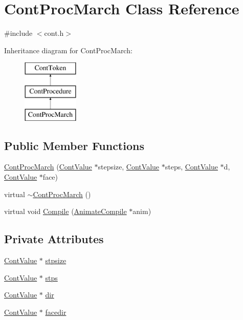 \hypertarget{a00077}{\section{Cont\-Proc\-March Class Reference}
\label{a00077}
}


{\ttfamily \#include $<$cont.\-h$>$}

Inheritance diagram for Cont\-Proc\-March\-:\begin{figure}[H]
\begin{center}
\leavevmode
\includegraphics[height=3.000000cm]{a00077}
\end{center}
\end{figure}
\subsection*{Public Member Functions}
\begin{DoxyCompactItemize}
\item 
\hyperlink{a00077_a759ac42b0956219b07c4ce0afec1595c}{Cont\-Proc\-March} (\hyperlink{a00086}{Cont\-Value} $\ast$stepsize, \hyperlink{a00086}{Cont\-Value} $\ast$steps, \hyperlink{a00086}{Cont\-Value} $\ast$d, \hyperlink{a00086}{Cont\-Value} $\ast$face)
\item 
virtual \hyperlink{a00077_a1612a8773803b35654327e280fe537d0}{$\sim$\-Cont\-Proc\-March} ()
\item 
virtual void \hyperlink{a00077_a98de0ad9854177887775bb191eb16ec4}{Compile} (\hyperlink{a00007}{Animate\-Compile} $\ast$anim)
\end{DoxyCompactItemize}
\subsection*{Private Attributes}
\begin{DoxyCompactItemize}
\item 
\hyperlink{a00086}{Cont\-Value} $\ast$ \hyperlink{a00077_a513de77437d22245d06148c952ee4aea}{stpsize}
\item 
\hyperlink{a00086}{Cont\-Value} $\ast$ \hyperlink{a00077_a4c65cf252b4efcf178a0cfd89c754efa}{stps}
\item 
\hyperlink{a00086}{Cont\-Value} $\ast$ \hyperlink{a00077_a02a9dde1ad80637c51c84062520de523}{dir}
\item 
\hyperlink{a00086}{Cont\-Value} $\ast$ \hyperlink{a00077_acf1dac23572c0dd7eeb2ac7446aeb5b0}{facedir}
\end{DoxyCompactItemize}
